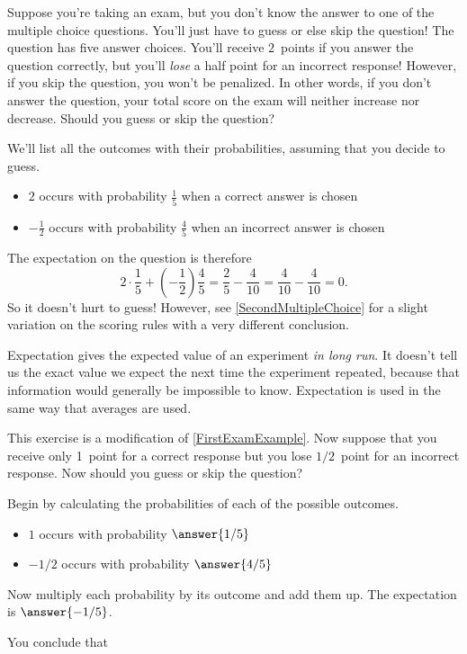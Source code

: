 \documentclass{ximera}
\begin{document}
\begin{example}\label{FirstExamExample}
Suppose you're taking an exam, but you
don't know the answer to one of the
multiple choice questions. You'll just have to guess or
else skip the question!
The question has five answer choices. You'll receive
$2$~points if you answer the question correctly,
but you'll {\em lose}
a half point for an incorrect response!
However, if you skip the question, you won't be penalized.
In other words, if you don't answer the question, your total
score on the exam will neither increase nor decrease.
Should you guess or skip the question?

We'll list all the outcomes with their probabilities,
assuming that you decide to guess.
\begin{itemize}
\item $2$ occurs with probability $\frac{1}{5}$ when
a correct answer is chosen
\item $-\frac{1}{2}$ occurs with probability $\frac{4}{5}$
when an incorrect answer is chosen
\end{itemize}
The expectation on the question is therefore
\[2\cdot\frac{1}{5}+\left(-\frac{1}{2}\right)\frac{4}{5}
=\frac{2}{5}-\frac{4}{10}
=\frac{4}{10}-\frac{4}{10}
=0.\]
So it doesn't hurt to guess!
However, see \autoref{SecondMultipleChoice} for a slight
variation on the scoring rules
with a very different conclusion.
\end{example}

\begin{remark}
Expectation gives
the expected value of an experiment {\em in long run}.
It doesn't tell us the exact value we expect
the next time the experiment repeated, because that
information would generally be impossible to know.
Expectation is used in the same way that averages are used.
\end{remark}

\begin{exercise}
This exercise is a modification of \autoref{FirstExamExample}.
Now suppose that you receive only 1~point
for a correct response
but you lose $1/2$~point for an incorrect response.
Now should you guess or skip the question?

Begin by calculating the probabilities of each of the possible outcomes.
\begin{itemize}
\item $1$ occurs with probability $\answer{1/5}$
\item $-1/2$ occurs with probability $\answer{4/5}$
\end{itemize}

Now multiply each probability by its outcome and add them up.
The expectation is $\answer{-1/5}$.

You conclude that
\begin{multipleChoice}
\end{multipleChoice}
\end{exercise}
\end{document}
